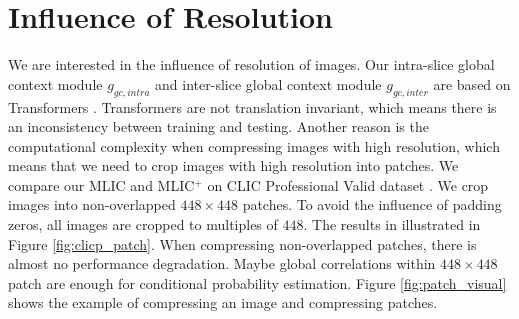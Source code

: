 \documentclass[sigconf]{acmart}
\begin{document}
\section{Influence of Resolution}
We are interested in the influence of resolution of images.
Our intra-slice global context module $g_{gc, intra}$ and
inter-slice global context module $g_{gc, inter}$ are based on
Transformers \cite{DBLP:conf/nips/VaswaniSPUJGKP17}.
Transformers are not translation invariant,
which means there is an inconsistency between training and testing.
Another reason is the computational complexity when compressing images with high resolution,
which means that we need to crop images with high resolution into patches.
We compare our MLIC and MLIC$^+$ on CLIC Professional Valid dataset \cite{clic2020dataset}.
We crop images into non-overlapped $448\times 448$ patches.
To avoid the influence of padding zeros, all images are cropped to multiples of $448$.
The results in illustrated in Figure \ref{fig:clicp_patch}.
When compressing non-overlapped patches, there is almost no performance degradation.
Maybe global correlations within $448\times 448$ patch are enough for conditional
probability estimation. Figure \ref{fig:patch_visual}
shows the example of compressing an image and compressing patches.
\end{document}
